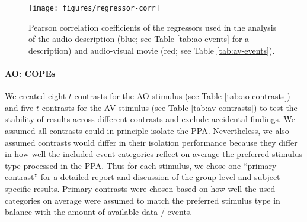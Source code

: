 \documentclass[english]{article}
\begin{document}
\begin{figure}
    \centering
    \texttt{[image: figures/regressor-corr]}
    \caption{Pearson
        correlation coefficients of the regressors used in the analysis of the
        audio-description (blue; see Table \ref{tab:ao-events} for a
        description) and audio-visual movie (red; see Table
        \ref{tab:av-events}).}
    \label{fig:reg-corr}
\end{figure}


\paragraph{AO: COPEs}




We created eight $t$-contrasts for the AO stimulus (see Table
\ref{tab:ao-contrasts}) and five $t$-contrasts for the AV stimulus (see Table
\ref{tab:av-contrasts}) to test the stability of results across different
contrasts and exclude accidental  findings.
We assumed all contrasts could in principle isolate the PPA. Nevertheless, we
also assumed contrasts would differ in their isolation performance because they
differ in how well the included event categories reflect on average the
preferred stimulus type processed in the PPA.
Thus for each stimulus, we chose one ``primary contrast'' for a detailed report
and discussion of the group-level and subject-specific results. Primary
contrasts were chosen based on how well the used categories on average were
assumed to match the preferred stimulus type in balance with the amount of
available data / events.
\end{document}
